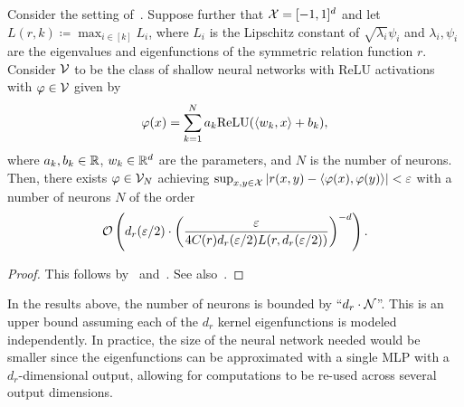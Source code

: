\begin{corollary}\label{cor:sym_iprod_kernel_neuron_bound}
	Consider the setting of~. Suppose further that ${\mathcal{X}} = [-1, 1]^d$ and let $L(r, k) \coloneq \max_{i \in [k]} L_i$, where $L_i$ is the Lipschitz constant of $\sqrt{\lambda_i} \psi_i$ and $\lambda_i, \psi_i$ are the eigenvalues and eigenfunctions of the symmetric relation function $r$. Consider ${\mathcal{V}}$ to be the class of shallow neural networks with ReLU activations with $\varphi \in {\mathcal{V}}$ given by
	\begin{equation*}
		\phi(x) = \sum_{k=1}^{N} a_k \mathrm{ReLU}(\iprod{w_k}{x} + b_k),
	\end{equation*}
	where $a_k, b_k \in \mathbb{R}$, $w_k \in \mathbb{R}^{d}$ are the parameters, and $N$ is the number of neurons. Then, there exists $\varphi \in {\mathcal{V}}_N$ achieving $\sup_{x,y \in \mathcal{X}}{\left\lvert r(x,y) - \left \langle \varphi(x), \varphi(y) \right\rangle\right\rvert} < \varepsilon$ with a number of neurons $N$ of the order
	\[{\mathcal{O}}\left(d_r(\varepsilon / 2) \cdot \left(\frac{\varepsilon}{4 C(r) d_r(\varepsilon / 2) L(r, d_r(\varepsilon/2))}\right)^{-d}\right).\]
\end{corollary}
\begin{proof}
	This follows by~ and~\parencite[Theorem 4]{poggioWhyWhenCan2017}. See also~\parencite{bachBreakingCurseDimensionality2016}.
\end{proof}

\begin{remark}
	In the results above, the number of neurons is bounded by ``$d_r \cdot {\mathcal{N}}$''. This is an upper bound assuming each of the $d_r$ kernel eigenfunctions is modeled independently. In practice, the size of the neural network needed would be smaller since the eigenfunctions can be approximated with a single MLP with a $d_r$-dimensional output, allowing for computations to be re-used across several output dimensions.
\end{remark}
